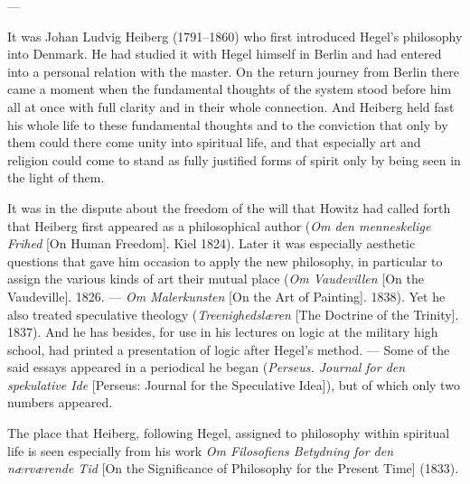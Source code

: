 \documentclass[12pt,a4paper]{book}
\newcommand{\opage}[1]{\marginnote{\footnotesize\textit{[#1]}}}
\begin{document}
\begin{center}---\end{center}

It was Johan Ludvig Heiberg (1791--1860) who first introduced Hegel's philosophy into
Denmark. He had studied it with Hegel himself in Berlin and had entered into a personal
relation with the master. On the return journey from Berlin there came a moment when the
fundamental thoughts of the system stood before him all at once with full clarity and in
their whole connection. And Heiberg held fast his whole life to these fundamental thoughts
and to the conviction that only by them could there come unity into spiritual life, and that
especially art and religion could come to stand as fully justified forms of spirit only by
being seen in the light of them.

It was in the dispute about the freedom of the will that Howitz had \opage{130}called forth that
Heiberg first appeared as a philosophical author (\emph{Om den menneskelige Frihed} [On
Human Freedom]. Kiel 1824). Later it was especially aesthetic questions that gave him
occasion to apply the new philosophy, in particular to assign the various kinds of art their
mutual place (\emph{Om Vaudevillen} [On the Vaudeville]. 1826. --- \emph{Om Malerkunsten} [On
the Art of Painting]. 1838). Yet he also treated speculative theology (\emph{Treenighedslæren}
[The Doctrine of the Trinity]. 1837). And he has besides, for use in his lectures on logic at
the military high school, had printed a presentation of logic after Hegel's method. --- Some
of the said essays appeared in a periodical he began (\emph{Perseus. Journal for den
spekulative Ide} [Perseus: Journal for the Speculative Idea]), but of which only two numbers
appeared.

The place that Heiberg, following Hegel, assigned to philosophy within spiritual life is seen
especially from his work \emph{Om Filosofiens Betydning for den nærværende Tid} [On the
Significance of Philosophy for the Present Time] (1833).
\end{document}
